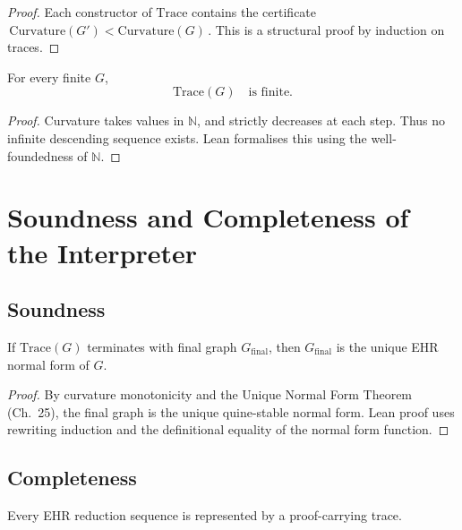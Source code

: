 \begin{proof}
Each constructor of $\mathrm{Trace}$ contains the certificate
$\,\mathrm{Curvature}(G')<\mathrm{Curvature}(G)\,$.
This is a structural proof by induction on traces.
\end{proof}

\begin{theorem}[Totality]
\label{thm:totality}
For every finite $G$,  
\[
\mathrm{Trace}(G)
\quad\text{is finite.}
\]
\end{theorem}

\begin{proof}
Curvature takes values in $\mathbb{N}$, and strictly decreases at each
step.  
Thus no infinite descending sequence exists.
Lean formalises this using the well-foundedness of $\mathbb{N}$.
\end{proof}


\section{Soundness and Completeness of the Interpreter}
\label{sec:sound-complete}

\subsection{Soundness}

\begin{theorem}[Soundness]
If $\mathrm{Trace}(G)$ terminates with final graph $G_{\mathrm{final}}$,
then $G_{\mathrm{final}}$ is the unique EHR normal form of $G$.
\end{theorem}

\begin{proof}
By curvature monotonicity and the Unique Normal Form Theorem
(Ch.~25), the final graph is the unique quine-stable normal form.  
Lean proof uses rewriting induction and the definitional equality of the
normal form function.
\end{proof}

\subsection{Completeness}

\begin{theorem}[Completeness]
Every EHR reduction sequence is represented by a proof-carrying trace.
\end{theorem}

